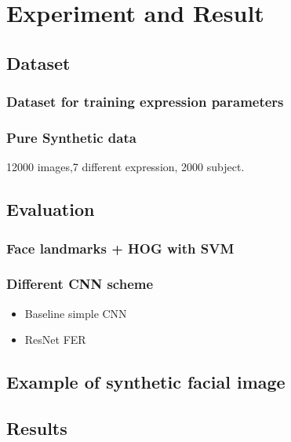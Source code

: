 \chapter{Experiment and Result}
\label{cha:methodology}

\section{Dataset}
\label{sec:softplat}
\subsection{Dataset for training expression parameters}
\subsection{Pure Synthetic data}
12000 images,7 different expression, 2000 subject.

\section{Evaluation}
\label{sec:hardplat}
\subsection{Face landmarks + HOG with SVM}
\subsection{Different CNN scheme}
\begin{itemize}
  \item Baseline simple CNN
  \item ResNet FER
\end{itemize}



\section{Example of synthetic facial image}


\section{Results}




